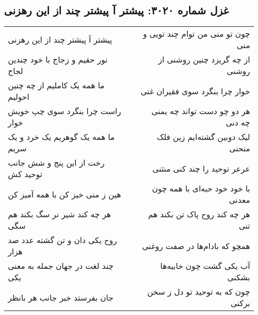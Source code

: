 \begin{center}
\section*{غزل شماره ۳۰۲۰: پیشتر آ پیشتر چند از این رهزنی}
\label{sec:3020}
\begin{longtable}{l p{0.5cm} r}
پیشتر آ پیشتر چند از این رهزنی
&&
چون تو منی من توام چند تویی و منی
\\
نور حقیم و زجاج با خود چندین لجاج
&&
از چه گریزد چنین روشنی از روشنی
\\
ما همه یک کاملیم از چه چنین احولیم
&&
خوار چرا بنگرد سوی فقیران غنی
\\
راست چرا بنگرد سوی چپ خویش خوار
&&
هر دو چو دست تواند چه یمنی چه دنی
\\
ما همه یک گوهریم یک خرد و یک سریم
&&
لیک دوبین گشته‌ایم زین فلک منحنی
\\
رخت از این پنج و شش جانب توحید کش
&&
عرعر توحید را چند کنی منثنی
\\
هین ز منی خیز کن با همه آمیز کن
&&
با خود خود حبه‌ای با همه چون معدنی
\\
هر چه کند شیر نر سگ بکند هم سگی
&&
هر چه کند روح پاک تن بکند هم تنی
\\
روح یکی دان و تن گشته عدد صد هزار
&&
همچو که بادام‌ها در صفت روغنی
\\
چند لغت در جهان جمله به معنی یکی
&&
آب یکی گشت چون خابیه‌ها بشکنی
\\
جان بفرستد خبر جانب هر بانظر
&&
چون که به توحید تو دل ز سخن برکنی
\\
\end{longtable}
\end{center}
